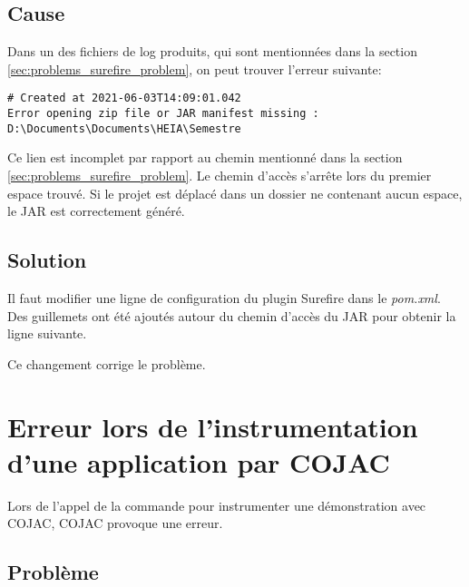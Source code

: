 \begin{minipage}{\linewidth}
\label{fig:problems_maven_skip_tests}
\end{minipage}

\subsection{Cause}

Dans un des fichiers de log produits, qui sont mentionnées dans la section \ref{sec:problems_surefire_problem}, on peut trouver l'erreur suivante:

\begin{verbatim}
# Created at 2021-06-03T14:09:01.042
Error opening zip file or JAR manifest missing : D:\Documents\Documents\HEIA\Semestre
\end{verbatim}

Ce lien est incomplet par rapport au chemin mentionné dans la section \ref{sec:problems_surefire_problem}. Le chemin d'accès s'arrête lors du premier espace trouvé. Si le projet est déplacé dans un dossier ne contenant aucun espace, le \gls{JAR} est correctement généré.

\subsection{Solution}

Il faut modifier une ligne de configuration du plugin Surefire dans le \textit{pom.xml}. Des guillemets ont été ajoutés autour du chemin d'accès du \gls{JAR} pour obtenir la ligne suivante.

Ce changement corrige le problème.

\section{Erreur lors de l'instrumentation d'une application par COJAC}
\label{sec:problem_cojac_instrumentation}

Lors de l'appel de la commande pour instrumenter une démonstration avec \gls{COJAC}, \gls{COJAC} provoque une erreur.

\subsection{Problème}

